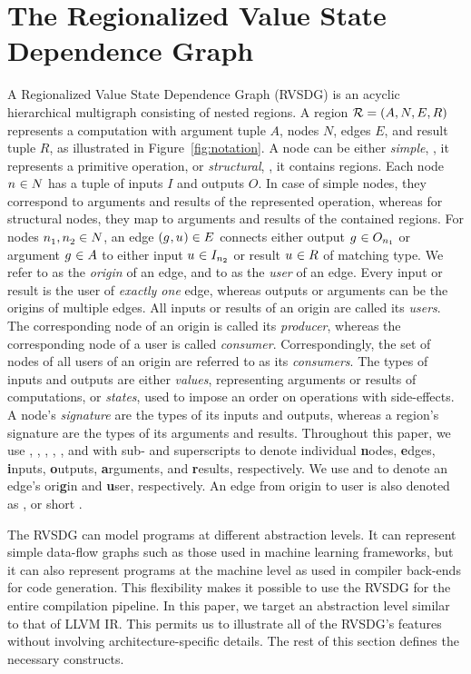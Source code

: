\section{The Regionalized Value State Dependence Graph}\label{sec:rvsdg}
A Regionalized Value State Dependence Graph (RVSDG) is an acyclic hierarchical multigraph
consisting of nested regions. A region ${\mathcal R} = (A, N, E, R)$ represents a computation with
argument tuple $A$, nodes $N$, edges $E$, and result tuple $R$, as illustrated
in Figure~\ref{fig:notation}. A node can be either
\emph{simple}, \ie, it represents a primitive operation, or \emph{structural}, \ie, it
contains regions. Each node $\mbox{$n_{}^{}$} \in N$ has a tuple of inputs $I$ and outputs $O$. In case of
simple nodes, they correspond to arguments and results of the represented operation, whereas for
structural nodes, they map to arguments and results of the contained regions. For nodes
$\mbox{$n_{1}^{}$}, \mbox{$n_{2}^{}$} \in N$, an edge $\mbox{$({\mbox{$g_{}^{}$}}, {\mbox{$u_{}^{}$}})$} \in E$ connects either output
$\mbox{$g_{}^{}$} \in O_{n_1}$ or argument $\mbox{$g_{}^{}$} \in A$ to either input $\mbox{$u_{}^{}$} \in I_{n_2}$ or result
$\mbox{$u_{}^{}$} \in R$ of matching type. We refer to \org as the \emph{origin} of an edge, and to \usr as the
\emph{user} of an edge. Every input or result is the user of \emph{exactly one} edge, whereas
outputs or arguments can be the origins of multiple edges. All inputs or results of an origin are
called its \emph{users}. The corresponding node of an origin is called its \emph{producer}, whereas
the corresponding node of a user is called \emph{consumer}. Correspondingly, the set of nodes of
all users of an origin are referred to as its \emph{consumers}. The types of inputs and outputs
are either \emph{values}, representing arguments or results of computations, or \emph{states}, used
to impose an order on operations with side-effects. A node's \emph{signature} are the
types of its inputs and outputs, whereas a region's signature are the types of its arguments
and results. %
Throughout this paper, we use \n, \e, \ipt, \opt, \argmnt, and \res with
sub- and superscripts to denote individual \textbf{n}odes, \textbf{e}dges, \textbf{i}nputs,
\textbf{o}utputs, \textbf{a}rguments, and \textbf{r}esults, respectively. We use \org and \usr to
denote an edge's ori\textbf{g}in and \textbf{u}ser, respectively. An edge \e from origin \org to
user \usr is also denoted as \edgec{\e}{\org}{\usr}, or short \edgeb{\org}{\usr}.

The RVSDG can model programs at different abstraction levels. It can represent simple
data-flow graphs such as those used in machine learning frameworks, but it can also represent
programs at the machine level as used in compiler back-ends for code generation. This
flexibility makes it possible to use the RVSDG for the entire compilation pipeline. In this paper,
we target an abstraction level similar to that of LLVM IR. This permits us to illustrate all of
the RVSDG's features without involving architecture-specific details. The rest of this section
defines the necessary constructs.

